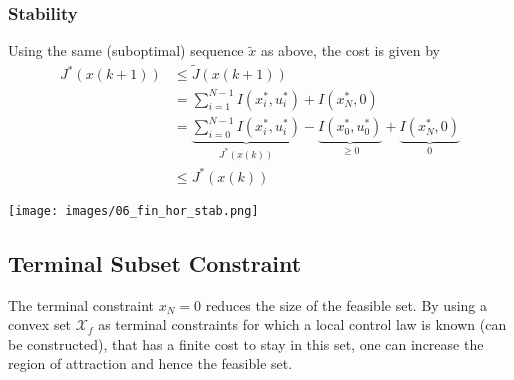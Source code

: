 \subsubsection{Stability}
Using the same (suboptimal) sequence $\widetilde{x}$ as above, the cost is given by
\begin{align*}
    J^*(x(k+1)) & \leq \widetilde{J}(x(k+1))                                                                                                         \\
                & = \sum_{i=1}^{N-1} I(x_i^*, u_i^*) + I(x_N^*, 0)                                                                                   \\
                & =\underbrace{\sum_{i=0}^{N-1} I(x_i^*, u_i^*)}_{J^*(x(k))} - \underbrace{I(x_0^*, u_0^*)}_{\geq 0}  + \underbrace{I(x_N^*, 0)}_{0} \\
                & \leq J^*(x(k))
\end{align*}
\begin{center}
    \texttt{[image: images/06\_fin\_hor\_stab.png]}
\end{center}

\subsection{Terminal Subset Constraint}
The terminal constraint $x_N = 0$ reduces the size of the feasible set. By using a convex set $\mathcal{X}_f$ as terminal constraints for which a local control law is known (can be constructed), that has a finite cost to stay in this set, one can increase the region of attraction and hence the feasible set.
